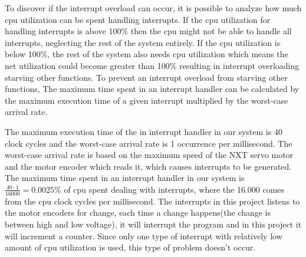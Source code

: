 To discover if the interrupt overload can occur, it is possible to analyze how much cpu utilization can be spent handling interrupts. If the cpu utilization for handling interrupts is above 100\% then the cpu might not be able to handle all interrupts, neglecting the rest of the system entirely. If the cpu utilization is below 100\%, the rest of the system also needs cpu utilization which means the net utilization could become greater than 100\% resulting in interrupt overloading starving other functions. \newline
To prevent an interrupt overload from starving other functions,
The maximum time spent in an interrupt handler can be calculated by the maximum execution time of a given interrupt multiplied by the worst-case arrival rate. 

The maximum execution time of the in interrupt handler in our system is 40 clock cycles and the worst-case arrival rate is 1 occurrence per millisecond. The worst-case arrival rate is based on the maximum speed of the NXT servo motor and the motor encoder which reads it, which causes interrupts to be generated. \newline
The maximum time spent in an interrupt handler in our system is \begin{math} \frac{40 \cdot 1}{16000} = 0.0025\% \end{math} of cpu spent dealing with interrupts, where the 16.000 comes from the cpu clock cycles per millisecond. The interrupts in this project listens to the motor encoders for change, each time a change happens(the change is between high and low voltage), it will interrupt the program and in this project it will increment a counter. Since only one type of interrupt with relatively low amount of cpu utilization is used, this type of problem doesn’t occur. 

